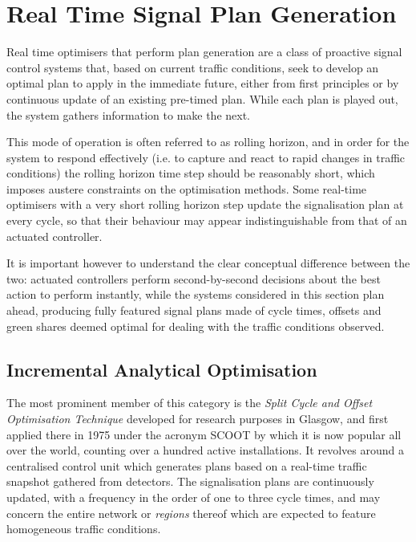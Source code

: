 \section{Real Time Signal Plan Generation}

Real time optimisers that perform plan generation are a class of proactive signal control systems that, based on current traffic conditions, seek to develop an optimal plan to apply in the immediate future, either from first principles or by continuous update of an existing pre-timed plan. While each plan is played out, the system gathers information to make the next.

This mode of operation is often referred to as rolling horizon, and in order for the system to respond effectively (i.e. to capture and react to rapid changes in traffic conditions) the rolling horizon time step should be reasonably short, which imposes austere constraints on the optimisation methods. Some real-time optimisers with a very short rolling horizon step update the signalisation plan at every cycle, so that their behaviour may appear indistinguishable from that of an actuated controller.

It is important however to understand the clear conceptual difference between the two: actuated controllers perform second-by-second decisions about the best action to perform instantly, while the systems considered in this section plan ahead, producing fully featured signal plans made of cycle times, offsets and green shares deemed optimal for dealing with the traffic conditions observed.

\subsection{Incremental Analytical Optimisation}
The most prominent member of this category is the \emph{Split Cycle and Offset Optimisation Technique} developed for research purposes in Glasgow, and first applied there in 1975 under the acronym SCOOT by which it is now popular all over the world, counting over a hundred active installations.
It revolves around a centralised control unit which generates plans based on a real-time traffic snapshot gathered from detectors. The signalisation plans are continuously updated, with a frequency in the order of one to three cycle times, and may concern the entire network or \emph{regions} thereof which are expected to feature homogeneous traffic conditions.\\


